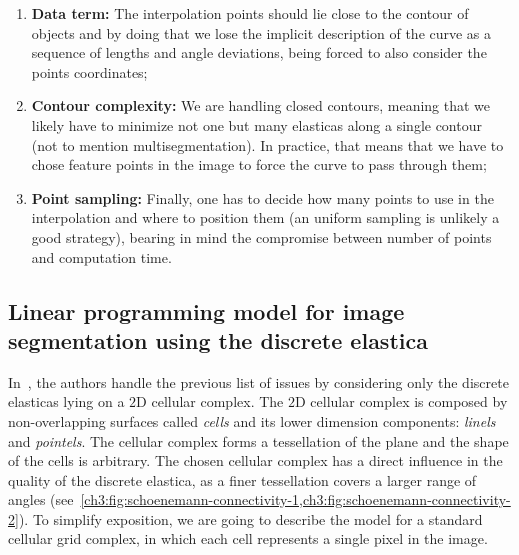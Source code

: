 \begin{enumerate}
	\item{\textbf{Data term:} The interpolation points should lie close to the contour of objects and by doing that we lose the implicit description of the curve as a sequence of lengths and angle deviations, being forced to also consider the points coordinates;}
	\item{\textbf{Contour complexity:} We are handling closed contours, meaning that we likely have to minimize not one but many elasticas along a single contour (not to mention multisegmentation). In practice, that means that we have to chose feature points in the image to force the curve to pass through them;}
	\item{\textbf{Point sampling:} Finally, one has to decide how many points to use in the interpolation and where to position them (an uniform sampling is unlikely  a good strategy), bearing in mind the compromise between number of points and computation time.}
\end{enumerate}




\subsection{Linear programming model for image segmentation using the discrete elastica}

In~\cite{schoenemann09linear}, the authors handle the previous list of issues by considering only the discrete elasticas lying on a $2$D cellular complex. The $2$D cellular complex is composed by non-overlapping surfaces called \emph{cells} and its lower dimension components: \emph{linels} and \emph{pointels}. The cellular complex forms a tessellation of the plane and the shape of the cells is arbitrary. The chosen cellular complex has a direct influence in the quality of the discrete elastica, as a finer tessellation covers a larger range of angles (see~\cref{ch3:fig:schoenemann-connectivity-1,ch3:fig:schoenemann-connectivity-2}). To simplify exposition, we are going to describe the model for a standard cellular grid complex, in which each cell represents a single pixel in the image.


